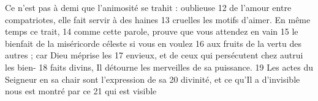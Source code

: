 Ce n'est pas à demi que l'animosité se trahit : oublieuse	 
12	 	de l'amour entre compatriotes, elle fait servir à des haines	 
13	 	cruelles les motifs d'aimer. En même temps ce trait,	 
14	 	comme cette parole, prouve que vous attendez en vain	 
15	 	le bienfait de la miséricorde céleste si vous en voulez	 
16	 	aux fruits de la vertu des autres ; car Dieu méprise les	 
17	 	envieux, et de ceux qui persécutent chez autrui les bien-	 
18	 	faits divins, Il détourne les merveilles de sa puissance.	 
19	 	Les actes du Seigneur en sa chair sont l'expression de sa	 
20	 	divinité, et ce qu'Il a d'invisible nous est montré par ce	 
21	 	qui est visible
